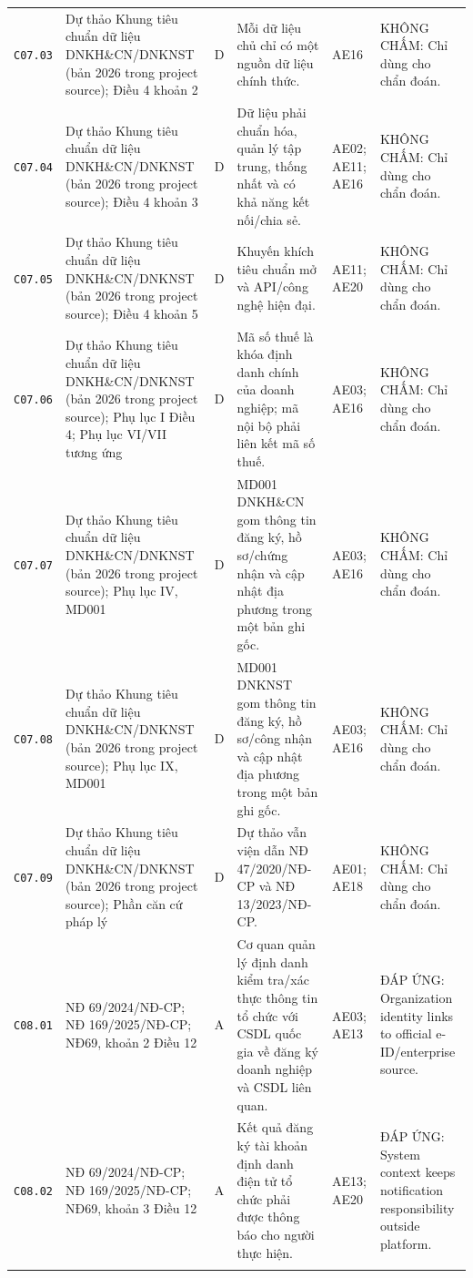 \begin{longtable}{@{}p{0.9cm}p{3.0cm}p{0.55cm}p{4.05cm}p{2.0cm}p{3.45cm}@{}}
\texttt{C07.03} & Dự thảo Khung tiêu chuẩn dữ liệu DNKH\&CN/DNKNST (bản 2026 trong project source); Điều 4 khoản 2 & D & Mỗi dữ liệu chủ chỉ có một nguồn dữ liệu chính thức. & AE16 & KHÔNG CHẤM: Chỉ dùng cho chẩn đoán. \\ \addlinespace[1pt]
\texttt{C07.04} & Dự thảo Khung tiêu chuẩn dữ liệu DNKH\&CN/DNKNST (bản 2026 trong project source); Điều 4 khoản 3 & D & Dữ liệu phải chuẩn hóa, quản lý tập trung, thống nhất và có khả năng kết nối/chia sẻ. & AE02; AE11; AE16 & KHÔNG CHẤM: Chỉ dùng cho chẩn đoán. \\ \addlinespace[1pt]
\texttt{C07.05} & Dự thảo Khung tiêu chuẩn dữ liệu DNKH\&CN/DNKNST (bản 2026 trong project source); Điều 4 khoản 5 & D & Khuyến khích tiêu chuẩn mở và API/công nghệ hiện đại. & AE11; AE20 & KHÔNG CHẤM: Chỉ dùng cho chẩn đoán. \\ \addlinespace[1pt]
\texttt{C07.06} & Dự thảo Khung tiêu chuẩn dữ liệu DNKH\&CN/DNKNST (bản 2026 trong project source); Phụ lục I Điều 4; Phụ lục VI/VII tương ứng & D & Mã số thuế là khóa định danh chính của doanh nghiệp; mã nội bộ phải liên kết mã số thuế. & AE03; AE16 & KHÔNG CHẤM: Chỉ dùng cho chẩn đoán. \\ \addlinespace[1pt]
\texttt{C07.07} & Dự thảo Khung tiêu chuẩn dữ liệu DNKH\&CN/DNKNST (bản 2026 trong project source); Phụ lục IV, MD001 & D & MD001 DNKH\&CN gom thông tin đăng ký, hồ sơ/chứng nhận và cập nhật địa phương trong một bản ghi gốc. & AE03; AE16 & KHÔNG CHẤM: Chỉ dùng cho chẩn đoán. \\ \addlinespace[1pt]
\texttt{C07.08} & Dự thảo Khung tiêu chuẩn dữ liệu DNKH\&CN/DNKNST (bản 2026 trong project source); Phụ lục IX, MD001 & D & MD001 DNKNST gom thông tin đăng ký, hồ sơ/công nhận và cập nhật địa phương trong một bản ghi gốc. & AE03; AE16 & KHÔNG CHẤM: Chỉ dùng cho chẩn đoán. \\ \addlinespace[1pt]
\texttt{C07.09} & Dự thảo Khung tiêu chuẩn dữ liệu DNKH\&CN/DNKNST (bản 2026 trong project source); Phần căn cứ pháp lý & D & Dự thảo vẫn viện dẫn NĐ 47/2020/NĐ-CP và NĐ 13/2023/NĐ-CP. & AE01; AE18 & KHÔNG CHẤM: Chỉ dùng cho chẩn đoán. \\ \addlinespace[1pt]
\texttt{C08.01} & NĐ 69/2024/NĐ-CP; NĐ 169/2025/NĐ-CP; NĐ69, khoản 2 Điều 12 & A & Cơ quan quản lý định danh kiểm tra/xác thực thông tin tổ chức với CSDL quốc gia về đăng ký doanh nghiệp và CSDL liên quan. & AE03; AE13 & ĐÁP ỨNG: Organization identity links to official e-ID/enterprise source. \\ \addlinespace[1pt]
\texttt{C08.02} & NĐ 69/2024/NĐ-CP; NĐ 169/2025/NĐ-CP; NĐ69, khoản 3 Điều 12 & A & Kết quả đăng ký tài khoản định danh điện tử tổ chức phải được thông báo cho người thực hiện. & AE13; AE20 & ĐÁP ỨNG: System context keeps notification responsibility outside platform. \\ \addlinespace[1pt]

\end{longtable}

